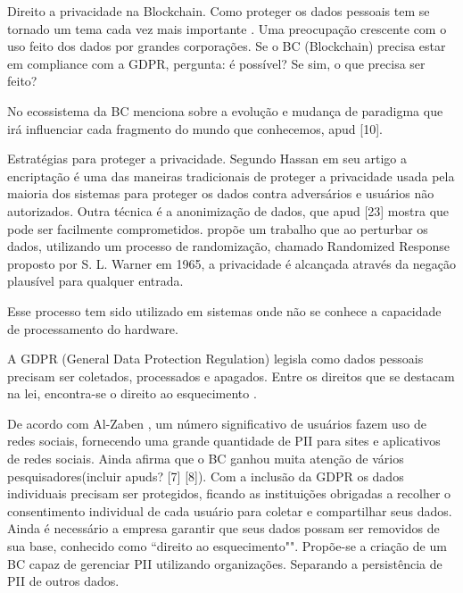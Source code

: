 Direito a privacidade na Blockchain. Como proteger os dados pessoais tem se tornado um tema cada vez mais importante \citep{Schwerin2018}. Uma preocupação crescente com o uso feito dos dados por grandes corporações. \cite{dsguaman} 
Se o BC (Blockchain) precisa estar em compliance com a GDPR, pergunta: é possível? Se sim, o que precisa ser feito?


No ecossistema da BC \cite{Schwerin2018} menciona sobre a evolução e mudança de paradigma que irá influenciar cada fragmento do mundo que conhecemos, apud [10].

Estratégias para proteger a privacidade. Segundo Hassan em seu artigo \cite{Hassan2020} a encriptação é uma das maneiras tradicionais de proteger a privacidade usada pela maioria dos sistemas para proteger os dados contra adversários e usuários não autorizados. Outra técnica é a anonimização de dados, que apud [23] \cite{Hassan2020} mostra que pode ser facilmente comprometidos. \cite{Dwork2006} propõe um trabalho que ao perturbar os dados, utilizando um processo de randomização, chamado Randomized Response proposto por S. L. Warner em 1965, a privacidade é alcançada através da negação plausível para qualquer entrada.

Esse processo tem sido utilizado em sistemas onde não se conhece a capacidade de processamento do hardware.


A GDPR (General Data Protection Regulation) legisla como dados pessoais precisam ser coletados, processados e apagados. Entre os direitos que se destacam na lei, encontra-se o direito ao esquecimento \cite{Everythi34:online}.

De acordo com Al-Zaben \cite{Al-ZabenNasr2018:article}, um número significativo de usuários fazem uso de redes sociais, fornecendo uma grande quantidade de PII para sites e aplicativos de redes sociais. Ainda afirma que o BC ganhou muita atenção de vários pesquisadores(incluir apuds? [7] [8]). Com a inclusão da GDPR os dados individuais precisam ser protegidos, ficando as instituições obrigadas a recolher o consentimento individual de cada usuário para coletar e compartilhar seus dados. Ainda é necessário a empresa garantir que seus dados possam ser removidos de sua base, conhecido como ``direito ao esquecimento"". Propõe-se a criação de um BC capaz de gerenciar PII utilizando organizações. Separando a persistência de PII de outros dados.

